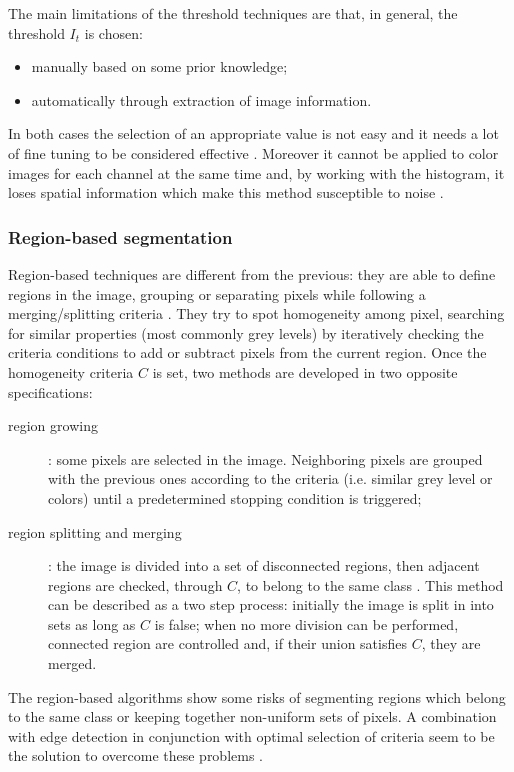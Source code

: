 \documentclass[../main.tex]{subfiles}
\begin{document}
The main limitations of the threshold techniques are that, in general, the threshold $I_{t}$ is chosen:
\begin{itemize}
    \item manually based on some prior knowledge;
    \item automatically through extraction of image information.
\end{itemize}
In both cases the selection of an appropriate value is not easy and it needs a lot of fine tuning to be considered effective \cite{automated_segm_tech}. Moreover it cannot be applied to color images for each channel at the same time and, by working with the histogram, it loses spatial information which make this method susceptible to noise \cite{segmentation_review_1}.

\subsubsection{\large{Region-based segmentation}}

Region-based techniques are different from the previous: they are able to define regions in the image, grouping or separating pixels while following a merging/splitting criteria \cite{kaganami2009region-based}.
They try to spot homogeneity among pixel, searching for similar properties (most commonly grey levels) by iteratively checking the criteria conditions to add or subtract pixels from the current region.
Once the homogeneity criteria $C$ is set, two methods are developed in two opposite specifications:
\begin{description}
\item[region growing] :  some  pixels are selected in the image. 
Neighboring pixels are grouped with the previous ones according to the criteria (i.e. similar grey level or colors) until a predetermined stopping condition is triggered;
\item[region splitting and merging] : the image is divided into a set of disconnected regions, then adjacent regions are checked, through $C$, to belong to the same class \cite{segmentation_review_1}.
This method can be described as a two step process: initially the image is split in  
into sets as long as $C$ is false; when no more division can be performed, connected region are controlled and, if their union satisfies $C$, they are merged. 
\end{description}

The region-based algorithms show some risks of segmenting regions which belong to the same class or keeping together non-uniform sets of pixels. A combination with edge detection in conjunction with optimal selection of criteria seem to be the solution to overcome these problems \cite{automated_segm_tech}.
\end{document}
